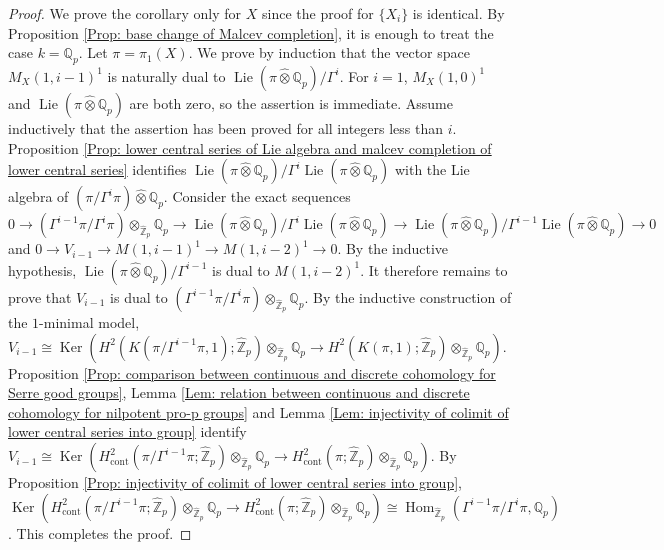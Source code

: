 \documentclass[11pt]{amsart}
\theoremstyle{definition}
\numberwithin{equation}{section}
\numberwithin{equation}{section}
\newcommand\QQ{\mathbb{Q}}
\newcommand\ZZ{\mathbb{Z}}
\DeclareMathOperator{\homo}{Hom}
\DeclareMathOperator{\Ker}{Ker}
\DeclareMathOperator{\Lie}{Lie}
\DeclareMathOperator{\cont}{cont}
\begin{document}
\begin{proof}
We prove the corollary only for $X$ since the proof for $\{X_i\}$ is identical. By Proposition \ref{Prop: base change of Malcev completion}, it is enough to treat the case $k=\QQ_p$. Let $\pi=\pi_1(X)$. We prove by induction that the vector space $M_X(1,i-1)^1$ is naturally dual to $\Lie(\pi\widehat{\otimes} \QQ_p)/\Gamma^i$. For $i=1$, $M_X(1,0)^1$ and $\Lie(\pi\widehat{\otimes}\QQ_p)$ are both zero, so the assertion is immediate. Assume inductively that the assertion has been proved for all integers less than $i$. Proposition \ref{Prop: lower central series of Lie algebra and malcev completion of lower central series} identifies $\Lie(\pi\widehat{\otimes} \QQ_p)/\Gamma^i\Lie(\pi\widehat{\otimes} \QQ_p)$ with the Lie algebra of $(\pi/\Gamma^i\pi)\widehat{\otimes} \QQ_p$. Consider the exact sequences $0\rightarrow (\Gamma^{i-1}\pi/\Gamma^{i}\pi)\otimes_{\widehat{\ZZ}_p}\QQ_p\rightarrow \Lie(\pi\widehat{\otimes} \QQ_p)/\Gamma^i\Lie(\pi\widehat{\otimes} \QQ_p)\rightarrow \Lie(\pi\widehat{\otimes} \QQ_p)/\Gamma^{i-1}\Lie(\pi\widehat{\otimes} \QQ_p)\rightarrow 0$ and $0\rightarrow V_{i-1}\rightarrow M(1,i-1)^1\rightarrow M(1,i-2)^1\rightarrow 0$. By the inductive hypothesis, $\Lie(\pi\widehat{\otimes} \QQ_p)/\Gamma^{i-1}$ is dual to $M(1,i-2)^1$. It therefore remains to prove that $ V_{i-1}$ is dual to $(\Gamma^{i-1}\pi/\Gamma^{i}\pi)\otimes_{\widehat{\ZZ}_p}\QQ_p$. By the inductive construction of the $1$-minimal model, $V_{i-1}\cong \Ker(H^2(K(\pi/\Gamma^{i-1}\pi,1);\widehat{\ZZ}_p)\otimes_{\widehat{\ZZ}_p}\QQ_p\rightarrow H^2(K(\pi,1);\widehat{\ZZ}_p)\otimes_{\widehat{\ZZ}_p}\QQ_p)$. Proposition \ref{Prop: comparison between continuous and discrete cohomology for Serre good groups}, Lemma \ref{Lem: relation between continuous and discrete cohomology for nilpotent pro-p groups} and Lemma \ref{Lem: injectivity of colimit of lower central series into group} identify $V_{i-1}\cong \Ker(H^2_{\cont}(\pi/\Gamma^{i-1}\pi;\widehat{\ZZ}_p)\otimes_{\widehat{\ZZ}_p}\QQ_p\rightarrow H^2_{\cont}(\pi;\widehat{\ZZ}_p)\otimes_{\widehat{\ZZ}_p}\QQ_p)$.  By Proposition \ref{Prop: injectivity of colimit of lower central series into group}, $\Ker(H^2_{\cont}(\pi/\Gamma^{i-1}\pi;\widehat{\ZZ}_p)\otimes_{\widehat{\ZZ}_p}\QQ_p\rightarrow H^2_{\cont}(\pi;\widehat{\ZZ}_p)\otimes_{\widehat{\ZZ}_p}\QQ_p)\cong\homo_{\widehat{\ZZ}_p}(\Gamma^{i-1}\pi/\Gamma^{i}\pi,\QQ_p)$. This completes the proof.
\end{proof}
\end{document}
